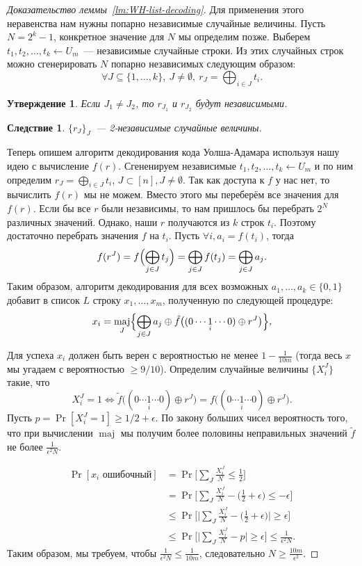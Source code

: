 \documentclass[12pt,a4paper]{article}
\DeclareMathOperator*{\maj}{maj}
\theoremstyle{definition}
\theoremstyle{plain}
\newtheorem{statement}{Утверждение}[section]
\newtheorem{corollary}{Следствие}[section]
\theoremstyle{remark}
\begin{document}
\begin{proof}[Доказательство леммы~\ref*{lm:WH-list-decoding}]
Для применения этого неравенства нам нужны попарно независимые случайные величины. Пусть $N=2^k - 1$, конкретное значение для $N$ мы определим позже. 
Выберем $t_1,t_2,\dotsc,t_k\gets U_m$~--- независимые случайные строки.
Из этих случайных строк можно сгенерировать $N$ попарно независимых следующим образом:
$$\forall J\subseteq \{1,\dotsc,k\},\ J\neq\emptyset,\ r_J = \bigoplus_{i\in J} t_i.$$

\begin{statement}
Если $J_1 \neq J_2$, то $r_{J_1}$ и $r_{J_2}$ будут независимыми.
\end{statement}
\begin{corollary}
$\{r_J\}_J$~--- 2-независимые случайные величины.
\end{corollary}

Теперь опишем алгоритм декодирования кода Уолша-Адамара используя нашу идею с
вычисление $f(r)$. Сгененируем независимые $t_1,t_2,\dotsc,t_k\gets U_m$ и
по ним определим $r_J = \bigoplus_{i\in J} t_i$, $J\subset [n], J\neq\emptyset$.
Так как доступа к $f$ у нас нет, то вычислить $f(r)$ мы не можем. Вместо этого
мы переберём все значения для $f(r)$. Если бы все $r$ были независимы, то нам
пришлось бы перебрать $2^N$ различных значений. Однако, наши $r$ получаются
из $k$ строк $t_i$. Поэтому достаточно перебрать значения $f$ на $t_i$.
Пусть $\forall i, a_i = f(t_i)$, тогда 
$$f(r^{J}) = f\Bigl(\bigoplus_{j\in J} t_j\Bigr) = \bigoplus_{j\in J} f(t_j) = \bigoplus_{j\in J} a_j.$$
Таким образом, алгоритм декодирования для всех возможных $a_1, \dotsc, a_k\in \{0,1\}$ добавит 
в список $L$ строку $x_1,\dotsc,x_m$, полученную по следующей процедуре: 
$$x_i = \maj_J\Bigl\{\bigoplus_{j\in J} a_j \oplus \tilde{f}\bigl((0\dotsb\underset{i}{1}\dotsb 0) \oplus r^J\bigr)\Bigr\},$$

Для успеха $x_i$ должен быть верен с вероятностью не менее $1 - \frac{1}{10m}$
(тогда весь $x$ мы угадаем с вероятностью $\ge9/10$).
Определим случайные величины $\{X^J_i\}$ такие, что 
$$X^J_i = 1\iff \tilde{f}\bigl((0\dotsb\underset{i}{1}\dotsb 0) \oplus r^J\bigr) 
= f\bigl((0\dotsb\underset{i}{1}\dotsb 0) \oplus r^J\bigr).$$
Пусть $p = \Pr[X^J_i = 1] \ge 1/2 + \epsilon.$ По закону больших чисел вероятность того, что при вычислении $\maj$ мы получим более половины неправильных
значений $\tilde{f}$ не более $\frac{1}{\epsilon^2 N}$. 

\begin{align*}
\Pr[\text{$x_i$ ошибочный}] 
&= \Pr\Biggl[\sum_J \frac{X^{J}_i}{N} \le \frac{1}{2}\Biggr]\\
&= \Pr\Biggl[\sum_J \frac{X^{J}_i}{N} - \biggl(\frac{1}{2} + \epsilon\biggr) \le -\epsilon\Biggr]\\
&\le \Pr\Biggl[\Biggl|\sum_J \frac{X^{J}_i}{N} - \biggl(\frac{1}{2} + \epsilon\biggr)\Biggr| \ge \epsilon\Biggr]\\
&\le \Pr\Biggl[\Biggl|\sum_J \frac{X^{J}_i}{N} - p\Biggr| \ge \epsilon\Biggr] \le \frac{1}{\epsilon^2 N}.
\end{align*}
Таким образом, мы требуем, чтобы $\frac{1}{\epsilon^2 N} \le \frac{1}{10m}$,
следовательно $N\ge\frac{10m}{\epsilon^2}.$
\end{proof}
\end{document}

